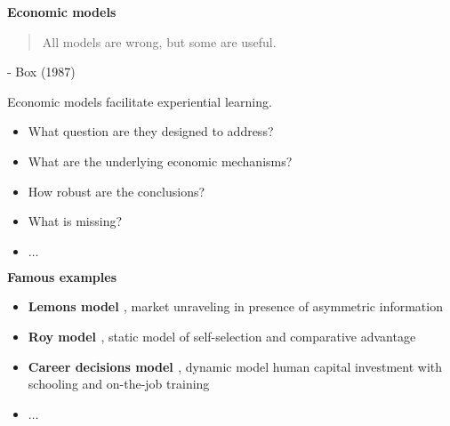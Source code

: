 \begin{frame}\begin{center}
		\LARGE\textbf{Economic models}
\end{center}\end{frame}
\begin{frame}\begin{quote}
All models are wrong, but some are useful.
\end{quote}\vspace{-0.5pt} \hspace{6cm} - Box (1987)
\end{frame}
\begin{frame}
Economic models facilitate experiential learning.\vspace{0.3cm}
\begin{itemize}\setlength\itemsep{1em}
\item What question are they designed to address?
\item What are the underlying economic mechanisms?
\item How robust are the conclusions?
\item What is missing?
\item $\hdots$
\end{itemize}

\end{frame}
\begin{frame}\textbf{Famous examples}\vspace{0.3cm}

\begin{itemize}\setlength\itemsep{1em}
\item \textbf{Lemons model \cite{Akerlof.1970}}, market unraveling in presence of asymmetric information
\item \textbf{Roy model \cite{Roy.1951}}, static model of self-selection and comparative advantage
\item \textbf{Career decisions model \cite{Keane.1997}}, dynamic model human capital investment with schooling and on-the-job training
\item $\hdots$
\end{itemize}

\end{frame}
